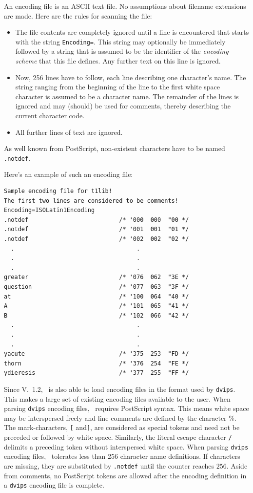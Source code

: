 An encoding file is an ASCII text file. No
assumptions about filename extensions are made. Here are the rules for
scanning the file:
\begin{itemize}
\item The file contents are completely ignored until a line is encountered
  that starts with the string \verb+Encoding=+. This string may optionally be
  immediately followed by a string that is assumed to be the identifier of the
  {\em encoding scheme} that this file defines. Any further text on this line
  is ignored.
\item Now, 256 lines have to follow, each line describing one
  character's name. The string ranging from the beginning of the line
  to the first white space character is assumed to be a character
  name. The remainder of the lines is ignored and may (should) be used
  for comments, thereby describing the current character code.
\item All further lines of text are ignored.
\end{itemize}
As well known from PostScript, non-existent characters have to be
named \verb+.notdef+.

Here's an example of such an encoding file:
\begin{verbatim}
Sample encoding file for t1lib!
The first two lines are considered to be comments!
Encoding=ISOLatin1Encoding       
.notdef                          /* '000  000  "00 */ 
.notdef                          /* '001  001  "01 */ 
.notdef                          /* '002  002  "02 */ 
  .                                   .
  .                                   .
  .                                   .
greater                          /* '076  062  "3E */
question                         /* '077  063  "3F */
at                               /* '100  064  "40 */
A                                /* '101  065  "41 */
B                                /* '102  066  "42 */
  .                                   .
  .                                   .
  .                                   .
yacute                           /* '375  253  "FD */
thorn                            /* '376  254  "FE */
ydieresis                        /* '377  255  "FF */ 
\end{verbatim}

Since V.~1.2, \tonelib\ is also able to load encoding files in the format used
by \verb+dvips+. This makes a large set of existing encoding files available
to the user. When parsing \verb+dvips+ encoding files, \tonelib\ requires
PostScript syntax. This means white space may be interspersed freely and
line comments are defined by the character \%. The mark-characters, \verb+[+
and\verb+]+, are considered as special tokens and need not be preceded or
followed by white space. Similarly, the literal escape character \verb+/+
delimits a preceding token without interspersed white space. When parsing
\verb+dvips+ encoding files, \tonelib\ tolerates less than 256 character name
definitions. If characters are missing, they are substituted by \verb+.notdef+
until the counter reaches $256$. Aside from comments, no PostScript tokens are
allowed after the encoding definition in a \verb+dvips+ encoding file is
complete.

